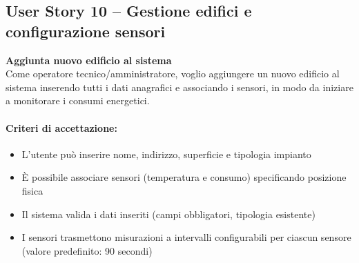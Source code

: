 \subsection{User Story 10 – Gestione edifici e configurazione sensori}
\label{us:aggiuntaEdificio}

\textbf{Aggiunta nuovo edificio al sistema} \\
Come operatore tecnico/amministratore, voglio aggiungere un nuovo edificio al sistema inserendo tutti i dati anagrafici e associando i sensori, in modo da iniziare a monitorare i consumi energetici.

\paragraph*{Criteri di accettazione:}
\begin{itemize}
    \item L'utente può inserire nome, indirizzo, superficie e tipologia impianto
    \item È possibile associare sensori (temperatura e consumo) specificando posizione fisica
    \item Il sistema valida i dati inseriti (campi obbligatori, tipologia esistente)
    \item I sensori trasmettono misurazioni a intervalli configurabili per ciascun sensore (valore predefinito: 90 secondi)
\end{itemize}

